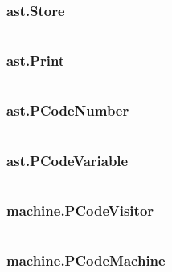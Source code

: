 \documentclass[11pt, numbers=endperiod, parskip=half]{scrartcl}
\begin{document}
\begin{landscape}
\subsubsection{ast.Store}
\inputminted{java}{RPN/src/ast/Store.java}
\subsubsection{ast.Print}
\inputminted{java}{RPN/src/ast/Print.java}

\subsubsection{ast.PCodeNumber}
\inputminted{java}{RPN/src/ast/PCodeNumber.java}
\subsubsection{ast.PCodeVariable}
\inputminted{java}{RPN/src/ast/PCodeVariable.java}

\subsubsection{machine.PCodeVisitor}
\inputminted{java}{RPN/src/machine/PCodeVisitor.java}
\subsubsection{machine.PCodeMachine}
\inputminted{java}{RPN/src/machine/PCodeMachine.java}

\end{landscape}
\end{document}
